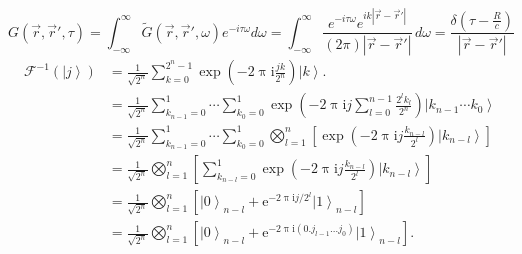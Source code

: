 \documentclass[11pt]{article}
\def\ee{\mathrm{e}}
\def\ii{\mathrm{i}}
\newcommand{\ket}[1]{\left\lvert{#1}\right\rangle}
\begin{document}
\[G(\vec{r},{\vec{r}}',\tau )=\int _{-\infty }^{\infty }\tilde{G}(\vec{r},{\vec{r}}',\omega )e^{-i \tau  \omega }d\omega=\int_{-\infty }^{\infty } \frac{e^{-i \tau  \omega } e^{i k |\vec{r}-{\vec{r}}'| }}{(2 \pi ) |\vec{r}-{\vec{r}}'| } \, d\omega=\frac{\delta  \left(\tau -\frac{R}{c}\right)}{|\vec{r}-{\vec{r}}'| }\]
\[
\begin{split}	
\mathcal{F}^{-1}(\ket{j})
&{}=\frac{1}{\sqrt{2^n}}\sum_{k=0}^{2^n-1}\exp\left(-2\uppi \ii \frac{jk}{2^n}\right)\ket{k}.\\
&{}=\frac{1}{\sqrt{2^n}}\sum_{k_{n-1}=0}^1\cdots\sum_{k_{0}=0}^1\exp\left(-2\uppi \ii j\sum_{l=0}^{n-1}\frac{2^l k_l}{2^n}\right)\ket{k_{n-1}\cdots k_0}\\
&{}=\frac{1}{\sqrt{2^n}}\sum_{k_{n-1}=0}^1\cdots\sum_{k_{0}=0}^1\bigotimes_{l=1}^n\left[\exp\left(-2\uppi \ii j\frac{k_{n-l}}{2^l}\right)\ket{k_{n-l}}\right]\\
&{}=\frac{1}{\sqrt{2^n}}\bigotimes_{l=1}^n\left[\sum_{k_{n-l}=0}^1\exp\left(-2\uppi \ii j\frac{k_{n-l}}{2^l}\right)\ket{k_{n-l}}\right]\\
&{}=\frac{1}{\sqrt{2^n}}\bigotimes_{l=1}^n\left[\ket{0}_{n-l}+\ee^{-2\uppi \ii j /2^l}\ket{1}_{n-l}\right]\\
&{}=\frac{1}{\sqrt{2^n}}\bigotimes_{l=1}^n\left[\ket{0}_{n-l}+\ee^{-2\uppi \ii ({0.j_{l-1}\ldots j_0})}\ket{1}_{n-l}\right].
\end{split}
\]

\newcommand{\lb}{\left(}
\newcommand{\rb}{\right)}
\newcommand{\ec}{\text{,}}
\newcommand{\ed}{\text{.}}
\newcommand{\bt}{\lb t\rb}
\newcommand{\deltaup}{\updelta}
\newcommand{\piup}{\uppi}
\newcommand{\ndd}{\,\mathrm{d}}
\end{document}
